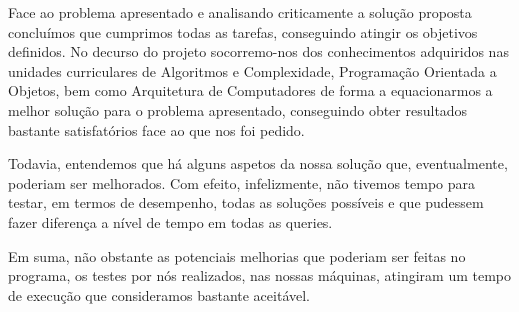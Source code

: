 \documentclass[a4paper]{article}
\begin{document}
Face ao problema apresentado e analisando criticamente a solução proposta concluímos
que cumprimos todas as tarefas, conseguindo atingir os objetivos definidos. No decurso
do projeto socorremo-nos dos conhecimentos adquiridos nas unidades curriculares de
Algoritmos e Complexidade, Programação Orientada a Objetos, bem como Arquitetura de Computadores
de forma a equacionarmos a melhor solução para o problema apresentado, conseguindo
obter resultados bastante satisfatórios face ao que nos foi pedido. \par
Todavia, entendemos que há alguns aspetos da nossa solução que, eventualmente,
poderiam ser melhorados. Com efeito, infelizmente, não tivemos tempo para testar,
em termos de desempenho, todas as soluções possíveis e que pudessem fazer diferença
a nível de tempo em todas as queries.\par
Em suma, não obstante as potenciais melhorias que poderiam ser feitas no
programa, os testes por nós realizados, nas nossas máquinas, atingiram
um tempo de execução que consideramos bastante aceitável.
\end{document}
